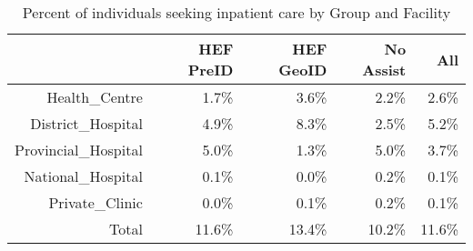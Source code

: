 \begin{table}[ht]
\centering
\begin{tabular}{rrrrr}
  \hline
 & HEF PreID & HEF GeoID & No Assist & All \\ 
  \hline
Health\_Centre & 1.7\% & 3.6\% & 2.2\% & 2.6\% \\ 
  District\_Hospital & 4.9\% & 8.3\% & 2.5\% & 5.2\% \\ 
  Provincial\_Hospital & 5.0\% & 1.3\% & 5.0\% & 3.7\% \\ 
  National\_Hospital & 0.1\% & 0.0\% & 0.2\% & 0.1\% \\ 
  Private\_Clinic & 0.0\% & 0.1\% & 0.2\% & 0.1\% \\ 
  Total & 11.6\% & 13.4\% & 10.2\% & 11.6\% \\ 
   \hline
\end{tabular}
\caption{Percent of individuals seeking inpatient care by Group and Facility} 
\end{table}

